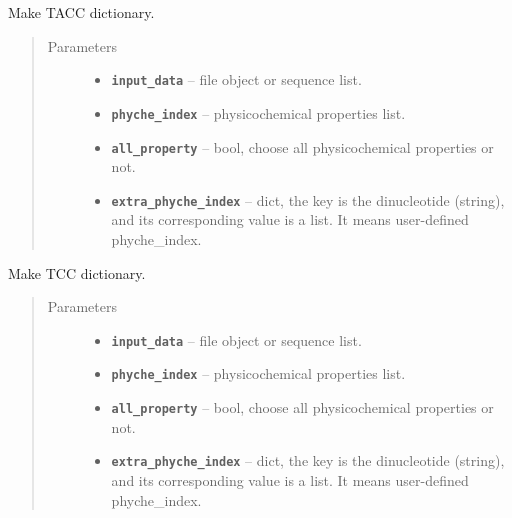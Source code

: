 \documentclass[letterpaper,10pt,english]{sphinxmanual}
\begin{document}

\begin{fulllineitems}
\label{reference/PyDNAac:PyDNAac.GetTACC}
Make TACC dictionary.
\begin{quote}\begin{description}
\item[{Parameters}] \leavevmode\begin{itemize}
\item {} 
\textbf{\texttt{input\_data}} -- file object or sequence list.

\item {} 
\textbf{\texttt{phyche\_index}} -- physicochemical properties list.

\item {} 
\textbf{\texttt{all\_property}} -- bool, choose all physicochemical properties or not.

\item {} 
\textbf{\texttt{extra\_phyche\_index}} -- dict, the key is the dinucleotide (string), and its corresponding value is a list.
It means user-defined phyche\_index.

\end{itemize}

\end{description}\end{quote}

\end{fulllineitems}


\begin{fulllineitems}
\label{reference/PyDNAac:PyDNAac.GetTCC}
Make TCC dictionary.
\begin{quote}\begin{description}
\item[{Parameters}] \leavevmode\begin{itemize}
\item {} 
\textbf{\texttt{input\_data}} -- file object or sequence list.

\item {} 
\textbf{\texttt{phyche\_index}} -- physicochemical properties list.

\item {} 
\textbf{\texttt{all\_property}} -- bool, choose all physicochemical properties or not.

\item {} 
\textbf{\texttt{extra\_phyche\_index}} -- dict, the key is the dinucleotide (string), and its corresponding value is a list.
It means user-defined phyche\_index.

\end{itemize}

\end{description}\end{quote}

\end{fulllineitems}
\end{document}
